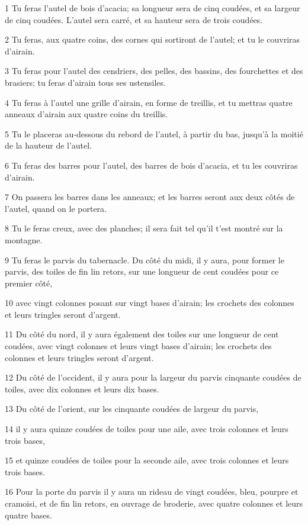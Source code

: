 \par 1 Tu feras l'autel de bois d'acacia; sa longueur sera de cinq coudées, et sa largeur de cinq coudées. L'autel sera carré, et sa hauteur sera de trois coudées.
\par 2 Tu feras, aux quatre coins, des cornes qui sortiront de l'autel; et tu le couvriras d'airain.
\par 3 Tu feras pour l'autel des cendriers, des pelles, des bassins, des fourchettes et des brasiers; tu feras d'airain tous ses ustensiles.
\par 4 Tu feras à l'autel une grille d'airain, en forme de treillis, et tu mettras quatre anneaux d'airain aux quatre coins du treillis.
\par 5 Tu le placeras au-dessous du rebord de l'autel, à partir du bas, jusqu'à la moitié de la hauteur de l'autel.
\par 6 Tu feras des barres pour l'autel, des barres de bois d'acacia, et tu les couvriras d'airain.
\par 7 On passera les barres dans les anneaux; et les barres seront aux deux côtés de l'autel, quand on le portera.
\par 8 Tu le feras creux, avec des planches; il sera fait tel qu'il t'est montré sur la montagne.
\par 9 Tu feras le parvis du tabernacle. Du côté du midi, il y aura, pour former le parvis, des toiles de fin lin retors, sur une longueur de cent coudées pour ce premier côté,
\par 10 avec vingt colonnes posant sur vingt bases d'airain; les crochets des colonnes et leurs tringles seront d'argent.
\par 11 Du côté du nord, il y aura également des toiles sur une longueur de cent coudées, avec vingt colonnes et leurs vingt bases d'airain; les crochets des colonnes et leurs tringles seront d'argent.
\par 12 Du côté de l'occident, il y aura pour la largeur du parvis cinquante coudées de toiles, avec dix colonnes et leurs dix bases.
\par 13 Du côté de l'orient, sur les cinquante coudées de largeur du parvis,
\par 14 il y aura quinze coudées de toiles pour une aile, avec trois colonnes et leurs trois bases,
\par 15 et quinze coudées de toiles pour la seconde aile, avec trois colonnes et leurs trois bases.
\par 16 Pour la porte du parvis il y aura un rideau de vingt coudées, bleu, pourpre et cramoisi, et de fin lin retors, en ouvrage de broderie, avec quatre colonnes et leurs quatre bases.
